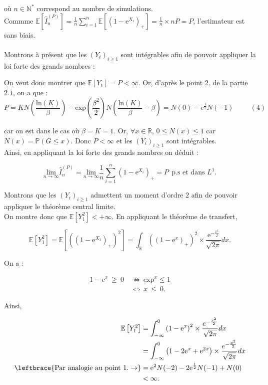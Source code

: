 \documentclass{article}
\theoremstyle{exostyle}
\newenvironment{questions}{
\begin{enumerate}[\hspace{12pt} 1.]}{\end{enumerate}}
\begin{document}
\begin{questions}
où $n \in \mathbb{N}^{*}$ correspond au nombre de simulations.\\

Commme $\mathbb{E} [\hat{I}_{n}^{(P)}] = \frac{1}{n} \sum_{i=1}^{n} \mathbb{E} \left[ \left(1-\text{e}^{X_{i}} \right)_{+}\right] = \frac{1}{n} \times nP = P$, l'estimateur est sans biais.\\
\\

Montrons à présent que les $(Y_{i})_{i \geq 1}$ sont intégrables afin de pouvoir appliquer la loi forte des grands nombres :

On veut donc montrer que $\mathbb{E}[Y_{1}] = P < \infty$. Or, d'après le point $2.$ de la partie $2.1$, on a que :
\[P = KN \left( \frac{\text{ln}(K)}{\beta} \right) - \text{exp}\left( \frac{\beta^{2}}{2}\right)N\left( \frac{\text{ln}(K)}{\beta} - \beta\right) = N(0)-\text{e}^{\frac{1}{2}}N(-1) \hspace{1cm} (4)\]

car on est dans le cas où $\beta = K = 1$. Or, $\forall x \in \mathbb{R}$, $0 \leq N(x) \leq 1$ car $N(x) = \mathbb{P} (G \leq x)$. Donc $P < \infty$ et les $(Y_{i})_{i \geq 1}$ sont intégrables.\\
Ainsi, en appliquant la loi forte des grands nombres on déduit : 

\[\underset{n \to \infty}{\text{lim}} \hat{I}_{n}^{(P)} = \underset{n \to \infty}{\text{lim}} \frac{1}{n} \sum_{i=1}^{n} \left( 1-\text{e}^{X_{i}} \right)_{+} = P \ \ \text{p.s et dans $L^{1}$}.\]

Montrons que les $(Y_{i})_{i \geq 1}$ admettent un moment d'ordre $2$ afin de pouvoir appliquer le théorème central limite.\\
On montre donc que $\mathbb{E}[Y_{1}^{2}] < + \infty$. En appliquant le théorème de transfert,

\[\mathbb{E}[Y_{1}^{2}] = \mathbb{E} \left[\left( \left( 1-\text{e}^{X_{1}} \right)_{+} \right)^{2} \right] = \int_{\mathbb{R}} \left( \left(1-\text{e}^{x} \right)_{+} \right)^{2} \times \frac{\text{e}^{-\frac{x^{2}}{2}}}{\sqrt{2\pi}}dx.\]

On a :

\begin{align*}
    1-\text{e}^{x} \ \geq \ 0 \ &\Leftrightarrow \ \text{exp}^{x} \leq 1\\
    &\Leftrightarrow \ x \ \leq \ 0.
\end{align*}

Ainsi, 

\begin{align*}
    \mathbb{E}\left[ Y_{1}^{2} \right] &= \int_{-\infty}^{0} \left(1-\text{e}^{x}\right)^{2} \times \frac{e^{-\frac{x^{2}}{2}}}{\sqrt{2\pi}}dx\\
    &= \int_{-\infty}^{0}  \left(1-2\text{e}^{x}+\text{e}^{2x}\right) \times \frac{e^{-\frac{x^{2}}{2}}}{\sqrt{2\pi}}dx\\
    \leftbrace{\text{Par analogie au point 1.} \rightarrow} &= \text{e}^{2} N(-2) -2\text{e}^{\frac{1}{2}} N(-1) + N(0)\\
    &< \infty.
\end{align*}


\end{questions}
\end{document}
